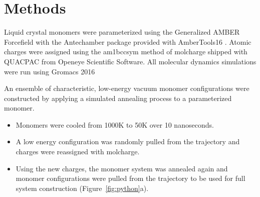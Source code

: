 \documentclass{article}
\begin{document}
  
  \section*{Methods}
 

 
  Liquid crystal monomers were parameterized using the Generalized AMBER Forcefield
  \cite{wang_development_2004} with the Antechamber package \cite{wang_automatic_2006}
  provided with AmberTools16 \cite{case_ambertools16_2016}. Atomic charges were
  assigned using the am1bccsym method of molcharge shipped with QUACPAC from Openeye %
  Scientific Software. All molecular dynamics simulations were run using Gromacs 2016  %
  \cite{bekker_gromacs:_1993,berendsen_gromacs:_1995,van_der_spoel_gromacs:_2005,hess_gromacs_2008}
  
  An ensemble of characteristic, low-energy vacuum monomer configurations
  were constructed by applying a simulated annealing process to a
  parameterized monomer.
  \begin{itemize}
    \item Monomers were cooled from 1000K to 50K over 10 nanoseconds.
    \item A low energy configuration was randomly pulled from the trajectory
    and charges were reassigned with molcharge. 
    \item Using the new charges, the monomer system was annealed again and monomer
    configurations were pulled from the trajectory to be used for full
    system construction (Figure~\ref{fig:python}a).
  \end{itemize}
\end{document}
